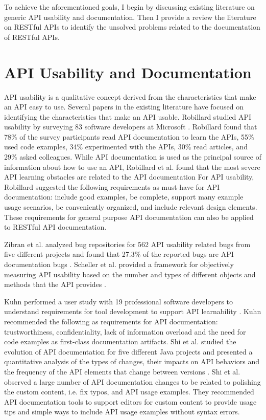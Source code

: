\documentclass[11pt,oneside]{book}
\begin{document}
To achieve the aforementioned goals, I begin by discussing existing literature on generic API usability and documentation. Then I provide a review the literature on RESTful APIs to identify the unsolved problems related to the documentation of RESTful APIs.


\section{API Usability and Documentation}
API usability is a qualitative concept derived from the characteristics that make an API easy to use. Several papers in the existing literature have focused on identifying the characteristics that make an API usable. Robillard studied API usability by surveying 83 software developers at Microsoft \cite{Robillard_a_field_study}. Robillard found that 78\% of the survey participants read API documentation to learn the APIs, 55\% used code examples, 34\% experimented with the APIs, 30\% read articles, and 29\% asked colleagues. While API documentation is used as the principal source of information about how to use an API, Robillard et al. found that the most severe API learning obstacles are related to the API documentation For API usability, Robillard suggested the following requirements as must-have for API documentation: include good examples, be complete, support many example usage scenarios, be conveniently organized, and include relevant design elements. These requirements for general purpose API documentation can also be applied to RESTful API documentation.

Zibran et al. analyzed bug repositories  for 562 API usability related bugs from five different projects and found that 27.3\% of the reported bugs are API documentation bugs \cite{zibran2011useful}. Scheller et al. provided a framework for objectively measuring API usability based on the number and types of different objects and methods that the API provides \cite{scheller2015automated}.

Kuhn performed a user study with 19 professional software developers to understand requirements for tool development to support API learnability \cite{Kuhn_on_designing}. Kuhn recommended the following as requirements for API documentation: trustworthiness, confidentiality, lack of information overload and the need for code examples as first-class documentation artifacts. Shi et al. studied the evolution of API documentation for five different Java projects and presented a quantitative analysis of the types of changes, their impacts on API behaviors and the frequency of the API elements that change between versions \cite{shi2011empirical}. Shi et al. observed a large number of API documentation changes to be related to polishing the custom content, i.e. fix typos, and API usage examples. They recommended API documentation tools to support editors for custom content to provide usage tips and simple ways to include API usage examples without syntax errors.
\end{document}
